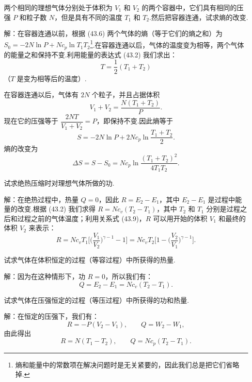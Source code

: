 \begin{xiti}

\quad 两个相同的理想气体分别处于体积为 $V_1$ 和 $V_2$ 的两个容器中，它们具有相同的压强 $P$ 和粒子数 $N$，但是具有不同的温度 $T_1$ 和 $T_2$.然后把容器连通，试求熵的改变.

解：在容器连通以前，根据 (43.6) 两个气体的熵（等于它们的熵之和）为 $S_0=-2N\ln P+Nc_p\ln T_1T_2$\footnote{熵和能量中的常数项在解决问题时是无关紧要的，因此我们总是把它们省略掉.}.在容器连通以后，气体的温度变为相等，两个气体的能量之和保持不变.利用能量的表达式 (43.2) 我们求出：
\begin{equation*}
  T=\frac{1}{2}\left(T_1+T_2\right)
\end{equation*}
（$T$ 是变为相等后的温度）.

在容器连通以后，气体有 $2N$ 个粒子，并且占据体积
\begin{equation*}
  V_1+V_2=\frac{N(T_1+T_2)}{P}.
\end{equation*}
现在它的压强等于 $\dfrac{2NT}{V_1+V_2}=P$，即保持不变.因此熵等于
\begin{equation*}
  S=-2N\ln P+2Nc_p\ln\frac{T_1+T_2}{2}.
\end{equation*}
熵的改变为
\begin{equation*}
  \Delta S=S-S_0=Nc_p\ln\frac{\left(T_1+T_2\right)^2}{4T_1T_2}.
\end{equation*}

\quad 试求绝热压缩时对理想气体所做的功.

解：在绝热过程中，热量 $Q=0$，因此 $R=E_2-E_1$，其中 $E_2-E_1$ 是过程中能量的改变.根据 (43.2) 我们求得 $R=Nc_v(T_2-T_1)$，其中 $T_2$ 和 $T_1$ 分别是过程之后和过程之前的气体温度；利用关系式 (43.9)，$R$ 可以用开始的体积 $V_1$ 和最终的体积 $V_2$ 来表示：
\begin{equation*}
  R=Nc_vT_1\Big[\Big(\frac{V_1}{V_2}\Big)^{\gamma-1}-1\Big]
  =Nc_vT_2\Big[1-\Big(\frac{V_2}{V_1}\Big)^{\gamma-1}\Big].
\end{equation*}

\quad 试求气体在体积恒定的过程（等容过程）中所获得的热量.

解：因为在这种情形下，功 $R=0$，所以我们有：
\begin{equation*}
  Q=E_2-E_1=Nc_v(T_2-T_1).
\end{equation*}

\quad 试求气体在压强恒定的过程（等压过程）中所获得的功和热量.

解：在恒定的压强下，我们有：
\begin{equation*}
  R=-P\left(V_2-V_1\right),\qquad Q=W_2-W_1,
\end{equation*}
由此得出
\begin{equation*}
  R=N(T_1-T_2),\qquad Q=Nc_p(T_2-T_1).
\end{equation*}


\end{xiti}
